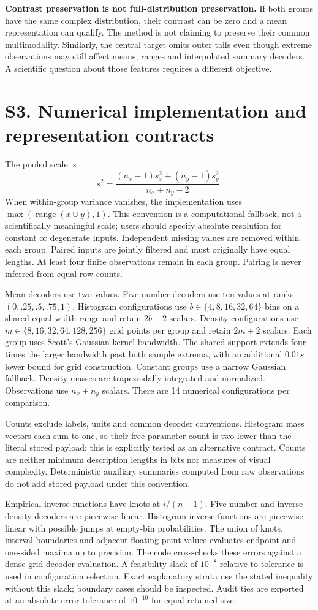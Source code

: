 \documentclass[10pt]{article}
\begin{document}
\textbf{Contrast preservation is not full-distribution preservation.} If both groups have the same complex distribution, their contrast can be zero and a mean representation can qualify. The method is not claiming to preserve their common multimodality. Similarly, the central target omits outer tails even though extreme observations may still affect means, ranges and interpolated summary decoders. A scientific question about those features requires a different objective.

\section*{S3. Numerical implementation and representation contracts}
The pooled scale is
\[
s^2=\frac{(n_x-1)s_x^2+(n_y-1)s_y^2}{n_x+n_y-2}.
\]
When within-group variance vanishes, the implementation uses $\max(\operatorname{range}(x\cup y),1)$. This convention is a computational fallback, not a scientifically meaningful scale; users should specify absolute resolution for constant or degenerate inputs. Independent missing values are removed within each group. Paired inputs are jointly filtered and must originally have equal lengths. At least four finite observations remain in each group. Pairing is never inferred from equal row counts.

Mean decoders use two values. Five-number decoders use ten values at ranks $(0,.25,.5,.75,1)$. Histogram configurations use $b\in\{4,8,16,32,64\}$ bins on a shared equal-width range and retain $2b+2$ scalars. Density configurations use $m\in\{8,16,32,64,128,256\}$ grid points per group and retain $2m+2$ scalars. Each group uses Scott's Gaussian kernel bandwidth. The shared support extends four times the larger bandwidth past both sample extrema, with an additional $0.01s$ lower bound for grid construction. Constant groups use a narrow Gaussian fallback. Density masses are trapezoidally integrated and normalized. Observations use $n_x+n_y$ scalars. There are 14 numerical configurations per comparison.

Counts exclude labels, units and common decoder conventions. Histogram mass vectors each sum to one, so their free-parameter count is two lower than the literal stored payload; this is explicitly tested as an alternative contract. Counts are neither minimum description lengths in bits nor measures of visual complexity. Deterministic auxiliary summaries computed from raw observations do not add stored payload under this convention.

Empirical inverse functions have knots at $i/(n-1)$. Five-number and inverse-density decoders are piecewise linear. Histogram inverse functions are piecewise linear with possible jumps at empty-bin probabilities. The union of knots, interval boundaries and adjacent floating-point values evaluates endpoint and one-sided maxima up to precision. The code cross-checks these errors against a dense-grid decoder evaluation. A feasibility slack of $10^{-8}$ relative to tolerance is used in configuration selection. Exact explanatory strata use the stated inequality without this slack; boundary cases should be inspected. Audit ties are exported at an absolute error tolerance of $10^{-10}$ for equal retained size.
\end{document}

